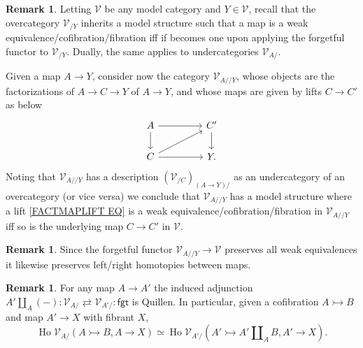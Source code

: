 \documentclass[a4paper,10pt
,draft
]{article}%
\numberwithin{equation}{section}
\numberwithin{figure}{section}
\theoremstyle{definition} %
\newtheorem{remark}[equation]{Remark}%
\DeclareMathOperator{\Ho}{Ho}
\newcommand{\V}{\ensuremath{\mathcal V}}
\newcommand{\1}{\ensuremath{\mathbbm 1}}%
\begin{document}
\begin{remark}\label{FACTMAPLIFT REM}
Letting $\V$ be any model category and $Y\in \V$,
recall that the overcategory $\V_{/Y}$ 
inherits a model structure
such that a map is a weak equivalence/cofibration/fibration 
iff if becomes one upon applying the forgetful functor to 
$\V_{/Y}$.
Dually, the same applies to undercategories $\V_{A/}$.

Given a map $A\to Y$, consider now the category
$\V_{A//Y}$, whose objects are the factorizations of $A\to C \to  Y$ of $A \to Y$, and whose maps are given by lifts
$C \to C'$ as below
\begin{equation}\label{FACTMAPLIFT EQ}
\begin{tikzcd}[column sep = 45pt]
	A \ar{r}
	\arrow{d}
&
	C' \arrow{d}
\\
	C\ar{r} \ar{ru}
&
	Y.
\end{tikzcd}
\end{equation}
Noting that $\V_{A//Y}$ has a description
$\left(\V_{/C}\right)_{(A\to Y)/}$
as an undercategory of an overcategory (or vice versa)
we conclude that $\V_{A//Y}$ has a model structure where a lift
\eqref{FACTMAPLIFT EQ}
is a weak equivalence/cofibration/fibration in $\V_{A//Y}$
iff so is the underlying map
$C\to C'$ in $\V$.
\end{remark}


\begin{remark}\label{UNDFGT REM}
Since the forgetful functor $\V_{A//Y} \to \V$
preserves all weak equivalences 
it likewise preserves left/right homotopies between maps.
\end{remark}


\begin{remark} \label{LEFTQUILUND REM}
For any map $A \to A'$ the induced adjunction
$A' \amalg_A (-) \colon \V_{A/} 
\rightleftarrows 
\V_{A'/} \colon \mathsf{fgt}$
is Quillen.
In particular,
given a cofibration 
$A \rightarrowtail B$
and map $A' \to X$ with fibrant $X$,
\[
\Ho \V_{A/}\left(A \rightarrowtail B, A \to X\right)
\simeq
\Ho \V_{A'/}\left(A' \rightarrowtail A' \amalg_A B, A' \to X\right).
\]
\end{remark}
\end{document}
